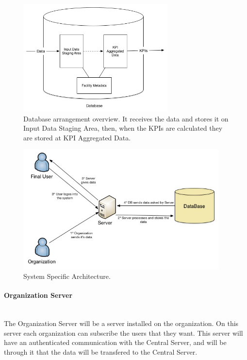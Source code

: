 \begin{figure}[t!]
  \centering
  \includegraphics[width=0.70\textwidth]{img/DataBase.jpg}
  \caption{Database arrangement overview. It receives the data and stores it on Input Data Staging Area, then, when the KPIs are calculated they are stored at KPI Aggregated Data.}
  \label{fig:db}
\end{figure}

\iffalse
\begin{figure}[t!]
  \centering
  \includegraphics[width=0.95\textwidth]{img/Arquitectura.jpg}
  \caption{System Specific Architecture. }
  \label{fig:architecture}
\end{figure}

\paragraph{\bf Organization Server} \hspace{0pt} \\ The Organization Server will be a server installed on the organization. On this server each organization can subscribe the users that they want. This server will have an authenticated communication with the Central Server, and will be through it that the data will be transfered to the Central Server.

